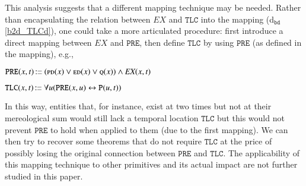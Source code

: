 \documentclass[ao]{iosart2x}
\newcommand{\bflist}{\begin{list}{}{\setlength{\topsep}{2mm}\setlength{\parsep}{0mm}\setlength{\leftmargin}{9.2mm}\setlength{\labelwidth}{8mm}}}
\newcommand{\eflist}{\end{list}}
\newcommand{\bdDefLabel}{\textrm{d$_\texttt{bd}$}}
\newcommand{\refbddf}[1]{({\bdDefLabel}\ref{#1})}
\newcommand{\pr}[1]{\mathtt{#1}}
\newcommand{\prbfo}[1]{{\textit{{#1}}}}
\newcommand{\ifif}{\leftrightarrow}
\newcommand\textequal{%
 \rule[.08ex]{5pt}{0.35pt}\llap{\rule[.78ex]{5pt}{0.35pt}}}
\newcommand{\sdef}{{\hspace{1.5pt}:\hspace{-2.5pt}\textequal\hspace{3pt}}}
\newcommand {\EDdcat} {\textsc{ed}}
\newcommand {\PDdcat} {\textsc{pd}}
\newcommand {\Qdcat} {\textsc{q}}
\newcommand {\Pd} {\ensuremath{\pr{P}}}
\newcommand {\PREd} {\ensuremath{\pr{PRE}}}
\newcommand {\TLCd} {\ensuremath{\pr{TLC}}}
\newcommand{\bfoexist}{\prbfo{EX}}
\begin{document}
This analysis suggests that a different mapping technique may be needed. Rather than encapsulating the relation between $\bfoexist$ and $\TLCd$ into the mapping  \refbddf{b2d_TLCd}, one could take a more articulated procedure: first introduce a direct mapping between $\bfoexist$ and $\PREd$, then define $\TLCd$ by using $\PREd$ (as defined in the mapping), e.g.,
%
\bflist
\item[] $\PREd(x,t) \sdef (\PDdcat(x) \lor \EDdcat(x) \lor \Qdcat(x)) \land \bfoexist(x,t)$
\item[] $\TLCd(x,t) \sdef \forall u(\PREd(x,u) \ifif \Pd(u,t))$
\eflist
%  
In this way, entities that, for instance, exist at two times but not at their mereological sum would still lack a temporal location $\TLCd$ but this would not prevent $\PREd$ to hold when applied to them (due to the first mapping). We can then try to recover some theorems that do not require $\TLCd$ at the price of possibly losing the original connection between $\PREd$ and $\TLCd$. The applicability of this mapping technique to other primitives and its actual impact are not further studied in this paper. 
\end{document}
